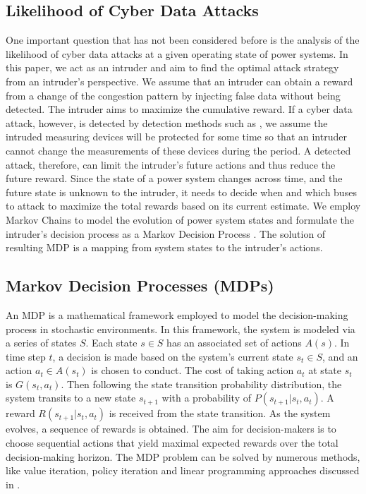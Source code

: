 \documentclass[conference,letterpaper,10pt]{IEEEtran}
\begin{document}
\subsection{Likelihood of Cyber Data Attacks}\label{sec:problem}
One important question that has not been considered before is the analysis of the likelihood of cyber data attacks at a given operating state of power systems. 
In this paper, we act as an intruder and aim to find the optimal attack strategy from an intruder's perspective.
We assume that an intruder can obtain a reward from a change of the congestion pattern by injecting false data without being detected.  The intruder aims to maximize the cumulative reward. If a cyber data attack, however, is detected by detection methods such as \cite{SJ13,LEDEH14,WGGCFSR14}, we assume the intruded measuring devices will be protected for some time so that an intruder cannot change the measurements of these devices during the period. A detected attack, therefore, can limit the intruder's future actions and thus reduce the future reward. Since the state of a power system changes across time, and the future state is unknown to the intruder, it needs to decide  when and which buses to attack to maximize the total rewards based on its current estimate.  We employ Markov Chains \cite{MP94} to model the evolution of power system states and formulate the intruder's decision process as a Markov Decision Process \cite{MP94}. The solution of resulting MDP is a mapping from system states to the intruder's actions.





\subsection{Markov Decision Processes (MDPs)}\label{sec:MDP}
An MDP is a mathematical framework employed to model the  decision-making process in stochastic environments. In this framework, the system is modeled via a series of states $S$. Each state $s\in S$ has an associated set of actions $A(s)$. In time step $t$, a decision is made based on the system's current state $s_t\in S$, and an action $a_t\in A(s_t)$ is chosen to conduct. The cost of taking action $a_t$ at state $s_t$ is $G(s_t,a_t)$. Then following the state transition probability distribution, the system transits to a new state $s_{t+1}$ with a probability of $P(s_{t+1}|s_t,a_t)$. A reward $R(s_{t+1}|s_t, a_t)$ is received from the state transition. 
As the system evolves, a sequence of rewards is obtained. 
The aim for decision-makers is to choose sequential actions that yield maximal expected rewards over the total decision-making horizon. The MDP problem can be solved by numerous methods, like value iteration, policy iteration and linear programming approaches discussed in \cite{MP94}. 
\end{document}
